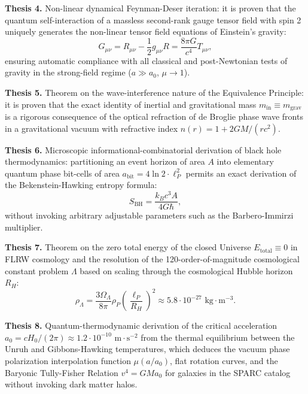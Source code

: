 \documentclass[11pt,a4paper]{article}
\theoremstyle{definition}
\begin{document}
\textbf{Thesis 4.} Non-linear dynamical Feynman-Deser iteration: it is proven that the quantum self-interaction of a massless second-rank gauge tensor field with spin 2 uniquely generates the non-linear tensor field equations of Einstein's gravity:
\begin{equation}\label{eq:0.6}\tag{0.6}
G_{\mu\nu} = R_{\mu\nu} - \frac{1}{2} g_{\mu\nu} R = \frac{8\pi G}{c^4} T_{\mu\nu},
\end{equation}
ensuring automatic compliance with all classical and post-Newtonian tests of gravity in the strong-field regime ($a \gg a_0$, $\mu \to 1$).

\textbf{Thesis 5.} Theorem on the wave-interference nature of the Equivalence Principle: it is proven that the exact identity of inertial and gravitational mass $m_{\text{in}} \equiv m_{\text{grav}}$ is a rigorous consequence of the optical refraction of de Broglie phase wave fronts in a gravitational vacuum with refractive index $n(r) = 1 + 2GM / (rc^2)$.

\textbf{Thesis 6.} Microscopic informational-combinatorial derivation of black hole thermodynamics: partitioning an event horizon of area $A$ into elementary quantum phase bit-cells of area $a_{\text{bit}} = 4\ln 2 \cdot \ell_P^2$ permits an exact derivation of the Bekenstein-Hawking entropy formula:
\begin{equation}\label{eq:0.7}\tag{0.7}
S_{\text{BH}} = \frac{k_B c^3 A}{4 G \hbar},
\end{equation}
without invoking arbitrary adjustable parameters such as the Barbero-Immirzi multiplier.

\textbf{Thesis 7.} Theorem on the zero total energy of the closed Universe $E_{\text{total}} \equiv 0$ in FLRW cosmology and the resolution of the 120-order-of-magnitude cosmological constant problem $\Lambda$ based on scaling through the cosmological Hubble horizon $R_H$:
\begin{equation}\label{eq:0.8}\tag{0.8}
\rho_\Lambda = \frac{3\Omega_\Lambda}{8\pi} \rho_P \left( \frac{\ell_P}{R_H} \right)^2 \approx 5.8 \cdot 10^{-27}\text{ kg}\cdot\text{m}^{-3}.
\end{equation}

\textbf{Thesis 8.} Quantum-thermodynamic derivation of the critical acceleration $a_0 = c H_0 / (2\pi) \approx 1.2 \cdot 10^{-10}\text{ m}\cdot\text{s}^{-2}$ from the thermal equilibrium between the Unruh and Gibbons-Hawking temperatures, which deduces the vacuum phase polarization interpolation function $\mu(a/a_0)$, flat rotation curves, and the Baryonic Tully-Fisher Relation $v^4 = G M a_0$ for galaxies in the SPARC catalog without invoking dark matter halos.
\end{document}
